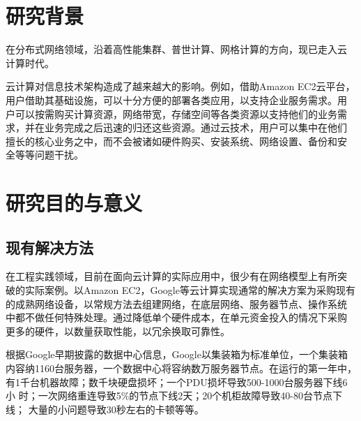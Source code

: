 \documentclass[oneside, phd]{njuthesis}
\begin{document}
\section{研究背景}

在分布式网络领域，沿着高性能集群、普世计算、网格计算的方向，现已走入云
计算时代。

云计算对信息技术架构造成了越来越大的影响。例如，借助Amazon EC2云平台，
用户借助其基础设施，可以十分方便的部署各类应用，以支持企业服务需求。用
户可以按需购买计算资源，网络带宽，存储空间等各类资源以支持他们的业务需
求，并在业务完成之后迅速的归还这些资源。通过云技术，用户可以集中在他们
擅长的核心业务之中，而不会被诸如硬件购买、安装系统、网络设置、备份和安
全等等问题干扰。

\section{研究目的与意义}

\subsection{现有解决方法}

在工程实践领域，目前在面向云计算的实际应用中，很少有在网络模型上有所突
破的实际案例。以Amazon EC2，Google等云计算实现通常的解决方案为采购现有
的成熟网络设备，以常规方法去组建网络，在底层网络、服务器节点、操作系统
中都不做任何特殊处理。通过降低单个硬件成本，在单元资金投入的情况下采购
更多的硬件，以数量获取性能，以冗余换取可靠性。

根据Google早期披露的数据中心信息，Google以集装箱为标准单位，一个集装箱
内容纳1160台服务器，一个数据中心将容纳数万服务器节点。在运行的第一年中，
有1千台机器故障；数千块硬盘损坏；一个PDU损坏导致500-1000台服务器下线6小
时；一次网络重连导致5\%的节点下线2天；20个机柜故障导致40-80台节点下线；
大量的小问题导致30秒左右的卡顿等等\cite{Dean2009}。
\end{document}
